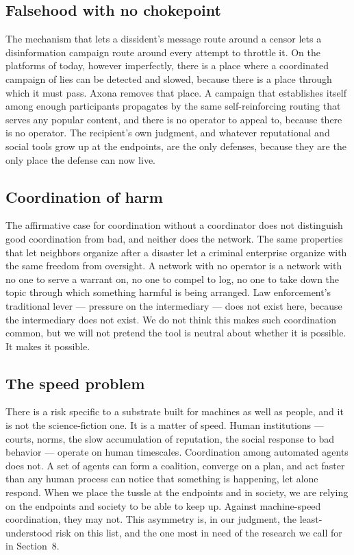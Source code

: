 \documentclass[nobib,justified]{tufte-handout}
\begin{document}
\subsection{Falsehood with no chokepoint}

The mechanism that lets a dissident's message route around a censor lets a
disinformation campaign route around every attempt to throttle it. On the
platforms of today, however imperfectly, there is a place where a coordinated
campaign of lies can be detected and slowed, because there is a place through
which it must pass. Axona removes that place. A campaign that establishes itself
among enough participants propagates by the same self-reinforcing routing that
serves any popular content, and there is no operator to appeal to, because there
is no operator. The recipient's own judgment, and whatever reputational and
social tools grow up at the endpoints, are the only defenses, because they are
the only place the defense can now live.

\subsection{Coordination of harm}

The affirmative case for coordination without a coordinator does not distinguish
good coordination from bad, and neither does the network. The same properties
that let neighbors organize after a disaster let a criminal enterprise organize
with the same freedom from oversight. A network with no operator is a network with
no one to serve a warrant on, no one to compel to log, no one to take down the
topic through which something harmful is being arranged. Law enforcement's
traditional lever --- pressure on the intermediary --- does not exist here,
because the intermediary does not exist. We do not think this makes such
coordination common, but we will not pretend the tool is neutral about whether it
is possible. It makes it possible.

\subsection{The speed problem}

There is a risk specific to a substrate built for machines as well as people, and
it is not the science-fiction one. It is a matter of speed. Human institutions
--- courts, norms, the slow accumulation of reputation, the social response to
bad behavior --- operate on human timescales. Coordination among automated agents
does not. A set of agents can form a coalition, converge on a plan, and act
faster than any human process can notice that something is happening, let alone
respond. When we place the tussle at the endpoints and in society, we are relying
on the endpoints and society to be able to keep up. Against machine-speed
coordination, they may not. This asymmetry is, in our judgment, the
least-understood risk on this list, and the one most in need of the research we
call for in Section~8.
\end{document}
